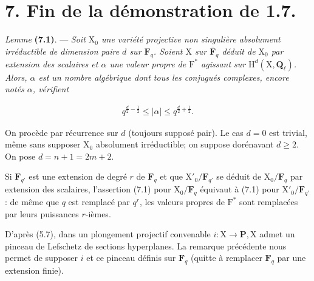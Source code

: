 \documentclass[10pt,leqno]{article}
\begin{document}
\section*{7. Fin de la démonstration de 1.7.}

\noindent \emph{Lemme} \textbf{(7.1)}. — {\itshape Soit \(\mathrm{X}_{0}\) une variété projective non singulière absolument irréductible de dimension \textup{paire} \(d\) sur \(\mathbf{F}_{q}\). Soient \(\mathrm{X}\) sur \(\overline{\mathbf{F}}_{q}\) déduit de \(\mathrm{X}_{0}\) par extension des scalaires et \(\alpha \) une valeur propre de \(\mathrm{F}^{*}\) agissant sur \(\mathrm{H}^{d}(\mathrm{X},\mathbf{Q}_{\ell })\). Alors, \(\alpha \) est un nombre algébrique dont tous les conjugués complexes, encore notés \(\alpha \), vérifient}\par

\begin{equation*}\begin{gathered}q^{\frac{d}{2}- \frac{1}{2}} \leq  |\alpha | \leq  q^{\frac{d}{2}+\frac{1}{2}}.\end{gathered}\tag{7.1.1}\end{equation*}

\noindent On procède par récurrence sur \(d\) (toujours supposé pair). Le cas \(d=0\) est trivial, même sans supposer \(\mathrm{X}_{0}\) absolument irréductible; on suppose dorénavant \(d\geq 2\). On pose \(d=n+1=2m+2\).\par

\clearpage

\label{physical-28}\par\smallskip

\noindent Si \(\mathbf{F}_{q'}\) est une extension de degré \(r\) de \(\mathbf{F}_{q}\) et que \(\mathrm{X}'_{0}/\mathbf{F}_{q'}\) se déduit de \(\mathrm{X}_{0}/\mathbf{F}_{q}\) par extension des scalaires, l’assertion (7.1) pour \(\mathrm{X}_{0}/\mathbf{F}_{q}\) équivaut à (7.1) pour \(\mathrm{X}'_{0}/\mathbf{F}_{q'}\) : de même que \(q\) est remplacé par \(q^{r}\), les valeurs propres de \(\mathrm{F}^{*}\) sont remplacées par leurs puissances \(r\)-ièmes.\par

\noindent D’après (5.7), dans un plongement projectif convenable \(i:\mathrm{X}\longrightarrow \mathbf{P}, \mathrm{X}\) admet un pinceau de Lefschetz de sections hyperplanes. La remarque précédente nous permet de supposer \(i\) et ce pinceau définis sur \(\mathbf{F}_{q}\) (quitte à remplacer \(\mathbf{F}_{q}\) par une extension finie).\par
\end{document}
